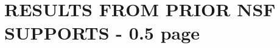 \documentclass[12pt]{article}
\begin{document}
\section{RESULTS FROM PRIOR NSF SUPPORTS - 0.5 page}
%
%
\clearpage
{}
%


\end{document}
